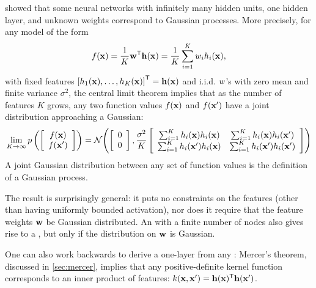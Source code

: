 \documentclass{article} %
\begin{document}
\citet[chapter 2]{neal1995bayesian} showed that some neural networks with infinitely many hidden units, one hidden layer, and unknown weights correspond to Gaussian processes.
More precisely, for any model of the form
%
\begin{align}
f({\bf{x}}) = \frac{1}{K}{\mathbf {{\bf{w}}}}^{\mathsf{T}} {\bf{h}}({\bf{x}}) = \frac{1}{K} \sum_{i=1}^K w_i h_i({\bf{x}}),
\label{eq:one-layer-gp}
\end{align}
%
with fixed%
 features $\left[ h_1({\bf{x}}), \dots, h_K({\bf{x}}) \right]^{\mathsf{T}} = {\bf{h}}({\bf{x}})$ and i.i.d. $w$'s with zero mean and finite variance $\sigma^2$, the central limit theorem implies that as the number of features $K$ grows, any two function values $f({\bf{x}})$ and $f({\bf{x}}')$ have a joint distribution approaching a Gaussian:
%
\begin{align}
\lim_{K \to \infty} p\left( \left[ \begin{array}{c} {f({\bf{x}})} \\ {f({\bf{x}}')} \end{array} \right] \right) = \mathcal{N}\!\left(\left[ \begin{array}{c} {0} \\ {0} \end{array} \right],
\frac{\sigma^2}{K} \left[ \begin{array}{cc}
\sum_{i=1}^K h_i({\bf{x}})h_i({\bf{x}}) &
\sum_{i=1}^K h_i({\bf{x}})h_i({\bf{x}}') \\
\sum_{i=1}^K h_i({\bf{x}}')h_i({\bf{x}}) &
\sum_{i=1}^K h_i({\bf{x}}')h_i({\bf{x}}')
\end{array} \right] \right)
\end{align}
A joint Gaussian distribution between any set of function values is the definition of a Gaussian process.

The result is surprisingly general:
it puts no constraints on the features (other than having uniformly bounded activation), nor does it require that the feature weights ${\bf{w}}$ be Gaussian distributed.  
An \MLP{} with a finite number of nodes also gives rise to a \gp{}, but only if the distribution on ${\bf{w}}$ is Gaussian.


One can also work backwards to derive a one-layer \MLP{} from any \gp{}:
Mercer's theorem, discussed in \cref{sec:mercer}, implies that any positive-definite kernel function corresponds to an inner product of features: $k({\bf{x}}, {\bf{x}}') = {\bf{h}}({\bf{x}}) ^{\mathsf{T}} {\bf{h}}({\bf{x}}')$.
\end{document}
